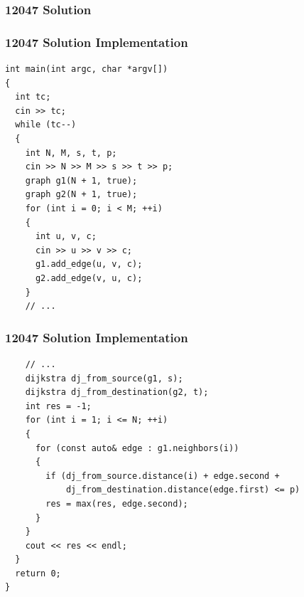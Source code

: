 \documentclass{beamer}
\newcommand{\uvalink}[2]{UVa Online Judge (http://uva.onlinejudge.org)
  problem number \href{#2}{\textcolor{blue}{#1}.}}
\newcounter{exo}
\newcommand{\exo}{
  \addtocounter{exo}{1}
  Exercice \arabic{exo}
}
\begin{document}
\fi

\ifanswers


\begin{frame}[containsverbatim]
\frametitle{12047 Solution}

\end{frame}

\begin{frame}[containsverbatim]
\frametitle{12047 Solution Implementation}
\scriptsize
\begin{lstlisting}
int main(int argc, char *argv[])
{
  int tc;
  cin >> tc;
  while (tc--)
  {
    int N, M, s, t, p;
    cin >> N >> M >> s >> t >> p;
    graph g1(N + 1, true);
    graph g2(N + 1, true);
    for (int i = 0; i < M; ++i)
    {
      int u, v, c;
      cin >> u >> v >> c;
      g1.add_edge(u, v, c);
      g2.add_edge(v, u, c);
    }
    // ...
\end{lstlisting}

\end{frame}

\begin{frame}[containsverbatim]
\frametitle{12047 Solution Implementation}
\scriptsize
\begin{lstlisting}
    // ...
    dijkstra dj_from_source(g1, s);
    dijkstra dj_from_destination(g2, t);
    int res = -1;
    for (int i = 1; i <= N; ++i)
    {
      for (const auto& edge : g1.neighbors(i))
      {
        if (dj_from_source.distance(i) + edge.second +
            dj_from_destination.distance(edge.first) <= p)
        res = max(res, edge.second);
      }
    }
    cout << res << endl;
  }
  return 0;
}

\end{lstlisting}

\end{frame}
\end{document}
